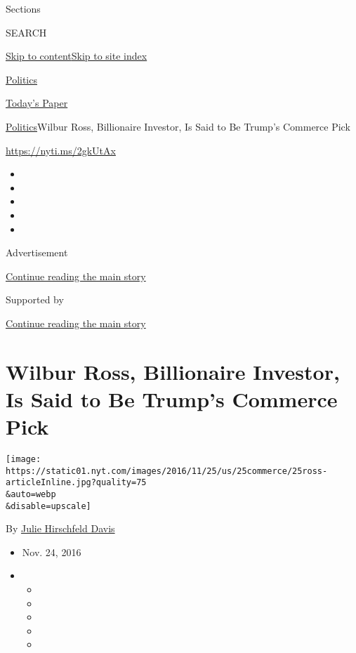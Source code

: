 Sections

SEARCH

\protect\hyperlink{site-content}{Skip to
content}\protect\hyperlink{site-index}{Skip to site index}

\href{https://www.nytimes.com/section/politics}{Politics}

\href{https://myaccount.nytimes.com/auth/login?response_type=cookie\&client_id=vi}{}

\href{https://www.nytimes.com/section/todayspaper}{Today's Paper}

\href{/section/politics}{Politics}\textbar{}Wilbur Ross, Billionaire
Investor, Is Said to Be Trump's Commerce Pick

\url{https://nyti.ms/2gkUtAx}

\begin{itemize}
\item
\item
\item
\item
\item
\end{itemize}

Advertisement

\protect\hyperlink{after-top}{Continue reading the main story}

Supported by

\protect\hyperlink{after-sponsor}{Continue reading the main story}

\hypertarget{wilbur-ross-billionaire-investor-is-said-to-be-trumps-commerce-pick}{%
\section{Wilbur Ross, Billionaire Investor, Is Said to Be Trump's
Commerce
Pick}\label{wilbur-ross-billionaire-investor-is-said-to-be-trumps-commerce-pick}}

\texttt{[image: https://static01.nyt.com/images/2016/11/25/us/25commerce/25ross-articleInline.jpg?quality=75\\\&auto=webp\\\&disable=upscale]}

By \href{https://www.nytimes.com/by/julie-hirschfeld-davis}{Julie
Hirschfeld Davis}

\begin{itemize}
\item
  Nov. 24, 2016
\item
  \begin{itemize}
  \item
  \item
  \item
  \item
  \item
  \end{itemize}
\end{itemize}

